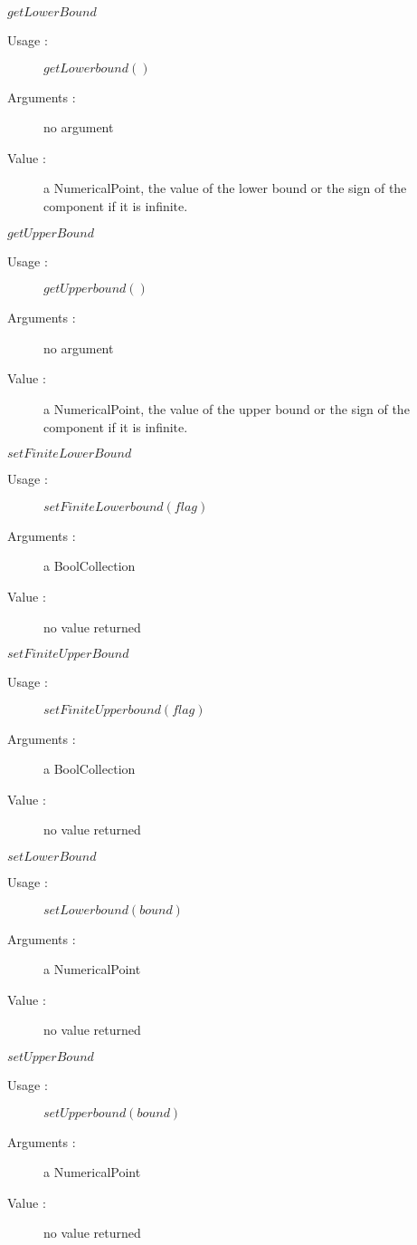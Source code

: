 \begin{description}
\begin{description}
  \item $getLowerBound$
    \begin{description}
    \item[Usage :] $getLowerbound()$
    \item[Arguments :] no argument
    \item[Value :] a NumericalPoint, the value of the lower bound or the sign of the component if it is infinite.
    \end{description}
    \bigskip

  \item $getUpperBound$
    \begin{description}
    \item[Usage :] $getUpperbound()$
    \item[Arguments :] no argument
    \item[Value :] a NumericalPoint, the value of the upper bound or the sign of the component if it is infinite.
    \end{description}
    \bigskip

  \item $setFiniteLowerBound$
    \begin{description}
    \item[Usage :] $setFiniteLowerbound(flag)$
    \item[Arguments :] a BoolCollection
    \item[Value :] no value returned
    \end{description}
    \bigskip

  \item $setFiniteUpperBound$
    \begin{description}
    \item[Usage :] $setFiniteUpperbound(flag)$
    \item[Arguments :] a BoolCollection
    \item[Value :] no value returned
    \end{description}
    \bigskip

  \item $setLowerBound$
    \begin{description}
    \item[Usage :] $setLowerbound(bound)$
    \item[Arguments :] a NumericalPoint
    \item[Value :] no value returned
    \end{description}
    \bigskip

  \item $setUpperBound$
    \begin{description}
    \item[Usage :] $setUpperbound(bound)$
    \item[Arguments :] a NumericalPoint
    \item[Value :] no value returned
    \end{description}
    \bigskip


\end{description}
\end{description}
